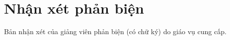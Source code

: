 \chapter*{Nhận xét phản biện}
\label{thanks}

Bản nhận xét của giảng viên phản biện (có chữ ký) do giáo vụ cung cấp.